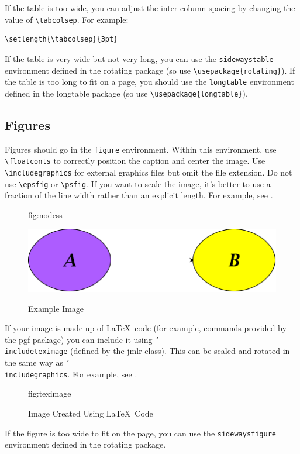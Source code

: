 \documentclass[pmlr]{jmlr}%
\newcommand{\cs}[1]{\texttt{\char`\\#1}}
\begin{document}
If the table is too wide, you can adjust the inter-column
spacing by changing the value of \verb|\tabcolsep|. For
example:
\begin{verbatim}
\setlength{\tabcolsep}{3pt}
\end{verbatim}
If the table is very wide but not very long, you can use the
\texttt{sidewaystable} environment defined in the
\textsf{rotating} package (so use \verb|\usepackage{rotating}|).
If the table is too long to fit on a page, you should use the
\texttt{longtable} environment defined in the \textsf{longtable}
package (so use \verb|\usepackage{longtable}|).

\subsection{Figures}
\label{sec:figures}

Figures should go in the \texttt{figure} environment. Within this
environment, use \verb|\floatconts| to correctly position the
caption and center the image. Use \verb|\includegraphics|
for external graphics files but omit the file extension. Do not
use \verb|\epsfig| or \verb|\psfig|. If you want to scale the
image, it's better to use a fraction of the line width rather
than an explicit length. For example, see .

\begin{figure}[htbp]
\floatconts
  {fig:nodess}
  {\caption{Example Image}}
  {\includegraphics[width=0.5\linewidth]{figures/nodes}}
\end{figure}

If your image is made up of \LaTeX\ code (for example, commands
provided by the \textsf{pgf} package) you can include it using
\cs{includeteximage} (defined by the \textsf{jmlr} class). This
can be scaled and rotated in the same way as \cs{includegraphics}.
For example, see .

\begin{figure}[htbp]
\floatconts
  {fig:teximage}
  {\caption{Image Created Using \LaTeX\ Code}}
  {}
\end{figure}

If the figure is too wide to fit on the page, you can use the
\texttt{sidewaysfigure} environment defined in the
\textsf{rotating} package.
\end{document}
